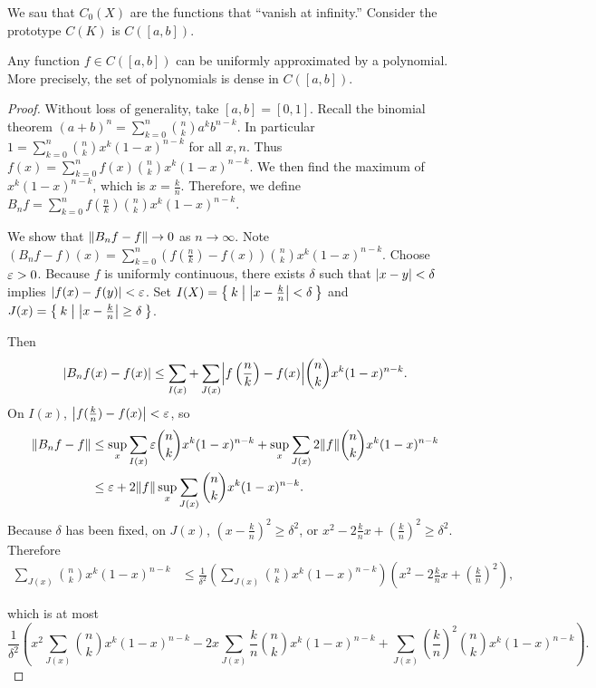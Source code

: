 \documentclass[10pt, twoside]{article}
\begin{document}
    We sau that $C_0(X)$ are the functions that ``vanish at infinity.'' Consider the prototype $C(K)$ is $C([a,b])$. 

    \begin{thm}
        Any function $f \in C([a,b])$ can be uniformly approximated by a polynomial. More precisely, the set of polynomials is dense in $C([a,b])$.
        \begin{proof}
            Without loss of generality, take $[a,b] = [0,1]$. Recall the binomial theorem $(a+b)^n = \sum_{k=0}^n \binom{n}{k}a^kb^{n-k}$. In particular $1 = \sum_{k=0}^n \binom{n}{k}x^k(1-x)^{n-k}$ for all $x,n$. Thus $f(x) = \sum_{k=0}^n f(x) \binom{n}{k}x^k(1-x)^{n-k}$. We then find the maximum of $x^k(1-x)^{n-k}$, which is $x = \frac{k}{n}$. Therefore, we define $B_nf = \sum_{k=0}^n f\left(\frac{n}{k}\right) \binom{n}{k}x^k(1-x)^{n-k}$.

            We show that $\norm{B_n f -f} \rightarrow 0$ as $n \rightarrow \infty$. Note $(B_nf - f)(x) = \sum_{k=0}^n \left( f\left(\frac{n}{k}\right) - f(x) \right) \binom{n}{k}x^k(1-x)^{n-k}$. Choose $\ep > 0$. Because $f$ is uniformly continuous, there exists $\delta$ such that $\abs{x-y} < \delta$ implies $\abs{f(x) - f(y)} < \ep$. Set $I(X) = \Set{k | \abs*{x-\frac{k}{n}} < \delta}$ and $J(x) = \Set{k | \abs*{x-\frac{k}{n}} \geq \delta}$.

            Then \[\abs{B_nf(x) - f(x)} \leq \sum_{I(x)} + \sum_{J(x)}  \abs*{f\left(\frac{n}{k}\right) - f(x)}  \binom{n}{k}x^k(1-x)^{n-k}. \] On $I(x)$, $\abs*{f(\frac{k}{n}) - f(x)} < \ep$, so \begin{align*}
                \norm*{B_nf - f} &\leq \sup_x \sum_{I(x)} \ep \binom{n}{k}x^k(1-x)^{n-k} + \sup_x \sum_{J(x)} 2 \norm{f} \binom{n}{k}x^k(1-x)^{n-k} \\
                & \leq \ep + 2 \norm{f} \sup_x \sum_{J(x)} \binom{n}{k}x^k(1-x)^{n-k}.
            \end{align*}
            Because $\delta$ has been fixed, on $J(x)$, $\left(x - \frac{k}{n}\right)^2 \geq \delta^2$, or $x^2 - 2 \frac{k}{n}x + \left(\frac{k}{n}\right)^2 \geq \delta^2$. Therefore \begin{align*}
                \sum_{J(x)} \binom{n}{k}x^k(1-x)^{n-k} &\leq \frac{1}{\delta^2} \left( \sum_{J(x)}\binom{n}{k}x^k(1-x)^{n-k} \right) \left( x^2 - 2 \frac{k}{n}x + \left(\frac{k}{n}\right)^2  \right),
            \end{align*}

            which is at most \[\frac{1}{\delta^2} \left( x^2 \sum_{J(x)} \binom{n}{k}x^k(1-x)^{n-k} - 2x \sum_{J(x)} \frac{k}{n} \binom{n}{k}x^k(1-x)^{n-k} + \sum_{J(x)} \left( \frac{k}{n} \right)^2 \binom{n}{k}x^k(1-x)^{n-k} \right).\]
            

\end{proof}
\end{thm}
\end{document}
